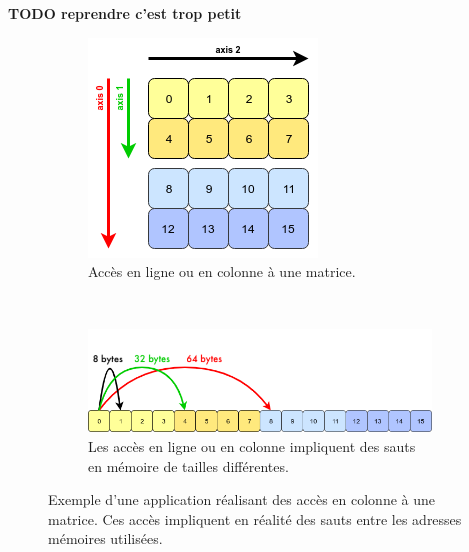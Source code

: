         
        \textbf{TODO reprendre c'est trop petit}
        \begin{figure}[ht]
            \centering
                \begin{subfigure}[b]{0.25\linewidth}
                \includegraphics[width=\linewidth]{images/dml_strides_acces_matrix.png}
                \caption{Accès en ligne ou en colonne à une matrice.}
                \label{pic:dml_strides_acces_matrix}
                \end{subfigure}
            ~ %
                \begin{subfigure}[b]{0.60\linewidth}
                \includegraphics[width=\linewidth]{images/dml_strides_acces.png}
                \caption{Les accès en ligne ou en colonne impliquent des sauts en mémoire de tailles différentes.}
                \label{pic:dml_strides_acces}
                \end{subfigure}
            \caption{Exemple d'une application réalisant des accès en colonne à une matrice. Ces accès impliquent en réalité des sauts entre les adresses mémoires utilisées.}\label{pic:dml_strides_acces_main}
        \end{figure}
    
